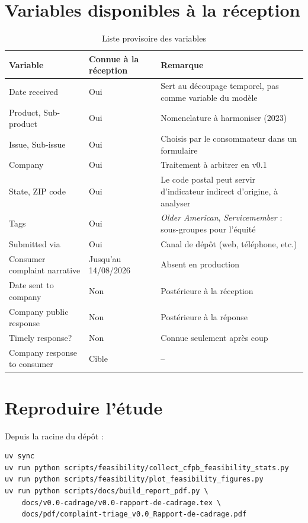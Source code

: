 \documentclass[11pt,a4paper]{article}
\begin{document}
\appendix
\newpage

\section{Variables disponibles à la réception}

\begin{table}[H]
\centering\small
\begin{tabularx}{\linewidth}{@{}l l Y@{}}
\toprule
Variable & Connue à la réception & Remarque \\
\midrule
Date received & Oui & Sert au découpage temporel, pas comme variable du modèle \\
Product, Sub-product & Oui & Nomenclature à harmoniser (2023) \\
Issue, Sub-issue & Oui & Choisis par le consommateur dans un formulaire \\
Company & Oui & Traitement à arbitrer en v0.1 \\
State, ZIP code & Oui & Le code postal peut servir d'indicateur indirect d'origine, à analyser \\
Tags & Oui & \emph{Older American}, \emph{Servicemember} : sous-groupes pour l'équité \\
Submitted via & Oui & Canal de dépôt (web, téléphone, etc.) \\
Consumer complaint narrative & Jusqu'au 14/08/2026 & Absent en production \\
Date sent to company & Non & Postérieure à la réception \\
Company public response & Non & Postérieure à la réponse \\
Timely response? & Non & Connue seulement après coup \\
Company response to consumer & Cible & -- \\
\bottomrule
\end{tabularx}
\caption{Liste provisoire des variables}
\end{table}

\section{Reproduire l'étude}

Depuis la racine du dépôt :

\begin{small}
\begin{verbatim}
uv sync
uv run python scripts/feasibility/collect_cfpb_feasibility_stats.py
uv run python scripts/feasibility/plot_feasibility_figures.py
uv run python scripts/docs/build_report_pdf.py \
    docs/v0.0-cadrage/v0.0-rapport-de-cadrage.tex \
    docs/pdf/complaint-triage_v0.0_Rapport-de-cadrage.pdf
\end{verbatim}
\end{small}
\end{document}
